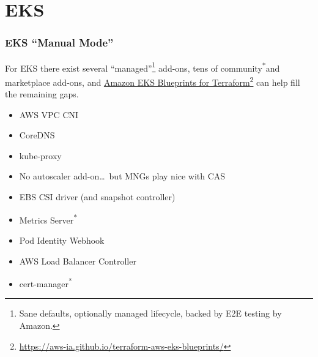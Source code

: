\documentclass[english]{beamer}
\newcommand{\hrefootnote}[2]{\href{#1}{#2}\footnote{\url{#1}}}
\newcommand{\supasterisk}{\textsuperscript{*}}
\begin{document}
\section{EKS}

\begin{frame}
  \frametitle{EKS ``Manual Mode''}

  For EKS there exist several ``managed''\footnote{Sane defaults, optionally
    managed lifecycle, backed by E2E testing by Amazon.} add-ons, tens of
  community\supasterisk and marketplace add-ons, and
  \hrefootnote{https://aws-ia.github.io/terraform-aws-eks-blueprints/}{Amazon
    EKS Blueprints for Terraform} can help fill the remaining gaps.
   \pause

  \begin{itemize}
    \item AWS VPC CNI
    \item CoreDNS
    \item kube-proxy \pause
    \item No autoscaler add-on\ldots\pause\ but MNGs play nice with CAS  \pause
    \item EBS CSI driver \pause (and snapshot controller) \pause
    \item Metrics Server\supasterisk
          \pause
    \item Pod Identity Webhook \pause {} \pause
    \item AWS Load Balancer Controller \pause {}
          \pause
    \item cert-manager\supasterisk
  \end{itemize}
\end{frame}
\end{document}
